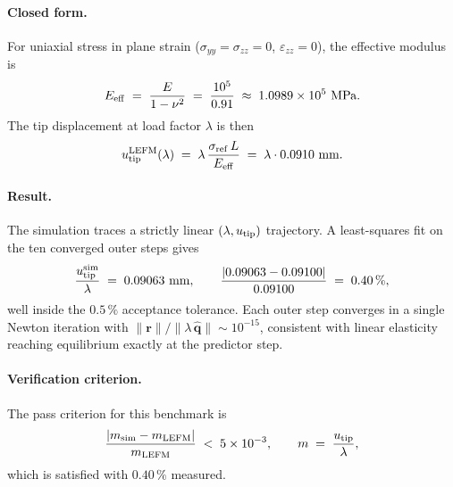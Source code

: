 \paragraph{Closed form.}
For uniaxial stress in plane strain ($\sigma_{yy}=\sigma_{zz}=0$, $\varepsilon_{zz}=0$),
the effective modulus is
\begin{equation}
E_{\rm eff} \;=\; \frac{E}{1-\nu^{2}} \;=\; \frac{10^{5}}{0.91} \;\approx\; 1.0989\times 10^{5}~\text{MPa}.
\end{equation}
The tip displacement at load factor $\lambda$ is then
\begin{equation}
u_{\rm tip}^{\rm LEFM}(\lambda) \;=\; \lambda\,\frac{\sigma_{\rm ref}\,L}{E_{\rm eff}} \;=\; \lambda\cdot 0.0910~\text{mm}.
\label{eq:arclength_lefm}
\end{equation}

\paragraph{Result.}
The simulation traces a strictly linear $(\lambda, u_{\rm tip})$ trajectory.
A least-squares fit on the ten converged outer steps gives
\begin{equation}
\frac{u_{\rm tip}^{\rm sim}}{\lambda} \;=\; 0.09063~\text{mm},
\qquad
\frac{|0.09063 - 0.09100|}{0.09100} \;=\; 0.40\,\%,
\end{equation}
well inside the $0.5\,\%$ acceptance tolerance. Each outer step converges
in a single Newton iteration with $\|\bm{r}\|/\|\lambda\,\hat{\bm{q}}\|
\sim 10^{-15}$, consistent with linear elasticity reaching equilibrium
exactly at the predictor step.

\paragraph{Verification criterion.}
The pass criterion for this benchmark is
\begin{equation}
\frac{|m_{\rm sim} - m_{\rm LEFM}|}{m_{\rm LEFM}} \;<\; 5\times 10^{-3},
\qquad
m \;=\; \frac{u_{\rm tip}}{\lambda},
\end{equation}
which is satisfied with $0.40\,\%$ measured.
